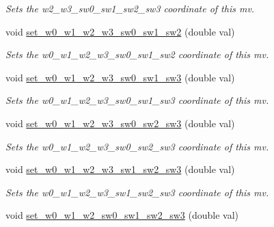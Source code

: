 \begin{DoxyCompactItemize}
\begin{DoxyCompactList}\small\item\em Sets the w2\-\_\-w3\-\_\-sw0\-\_\-sw1\-\_\-sw2\-\_\-sw3 coordinate of this mv. \end{DoxyCompactList}\item 
\hypertarget{classe3ga_1_1mv_a49d35b19d406ca918da3bec70f793891}{void \hyperlink{classe3ga_1_1mv_a49d35b19d406ca918da3bec70f793891}{set\-\_\-w0\-\_\-w1\-\_\-w2\-\_\-w3\-\_\-sw0\-\_\-sw1\-\_\-sw2} (double val)}\label{classe3ga_1_1mv_a49d35b19d406ca918da3bec70f793891}

\begin{DoxyCompactList}\small\item\em Sets the w0\-\_\-w1\-\_\-w2\-\_\-w3\-\_\-sw0\-\_\-sw1\-\_\-sw2 coordinate of this mv. \end{DoxyCompactList}\item 
\hypertarget{classe3ga_1_1mv_a43d039f3439bc96f044a8167c69a7c57}{void \hyperlink{classe3ga_1_1mv_a43d039f3439bc96f044a8167c69a7c57}{set\-\_\-w0\-\_\-w1\-\_\-w2\-\_\-w3\-\_\-sw0\-\_\-sw1\-\_\-sw3} (double val)}\label{classe3ga_1_1mv_a43d039f3439bc96f044a8167c69a7c57}

\begin{DoxyCompactList}\small\item\em Sets the w0\-\_\-w1\-\_\-w2\-\_\-w3\-\_\-sw0\-\_\-sw1\-\_\-sw3 coordinate of this mv. \end{DoxyCompactList}\item 
\hypertarget{classe3ga_1_1mv_a0729a315d3dae96d837dd30cbfa32723}{void \hyperlink{classe3ga_1_1mv_a0729a315d3dae96d837dd30cbfa32723}{set\-\_\-w0\-\_\-w1\-\_\-w2\-\_\-w3\-\_\-sw0\-\_\-sw2\-\_\-sw3} (double val)}\label{classe3ga_1_1mv_a0729a315d3dae96d837dd30cbfa32723}

\begin{DoxyCompactList}\small\item\em Sets the w0\-\_\-w1\-\_\-w2\-\_\-w3\-\_\-sw0\-\_\-sw2\-\_\-sw3 coordinate of this mv. \end{DoxyCompactList}\item 
\hypertarget{classe3ga_1_1mv_a15d406049d95fbfa0715707aa6e39561}{void \hyperlink{classe3ga_1_1mv_a15d406049d95fbfa0715707aa6e39561}{set\-\_\-w0\-\_\-w1\-\_\-w2\-\_\-w3\-\_\-sw1\-\_\-sw2\-\_\-sw3} (double val)}\label{classe3ga_1_1mv_a15d406049d95fbfa0715707aa6e39561}

\begin{DoxyCompactList}\small\item\em Sets the w0\-\_\-w1\-\_\-w2\-\_\-w3\-\_\-sw1\-\_\-sw2\-\_\-sw3 coordinate of this mv. \end{DoxyCompactList}\item 
\hypertarget{classe3ga_1_1mv_ab0a7967543d702f4dad76b76c962c54a}{void \hyperlink{classe3ga_1_1mv_ab0a7967543d702f4dad76b76c962c54a}{set\-\_\-w0\-\_\-w1\-\_\-w2\-\_\-sw0\-\_\-sw1\-\_\-sw2\-\_\-sw3} (double val)}\label{classe3ga_1_1mv_ab0a7967543d702f4dad76b76c962c54a}


\end{DoxyCompactItemize}
